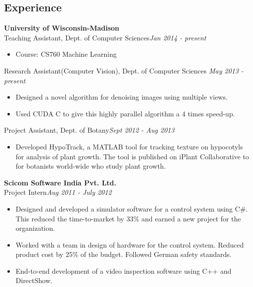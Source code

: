 \documentclass[margin]{res}
\begin{document}
\begin{resume}
\section{Experience}
 {\bf University of Wisconsin-Madison} \\
Teaching Assistant,  Dept. of Computer Sciences\hfill {\it Jan 2014 - present}
\begin{itemize} \itemsep -2pt  %
 \item Course: CS760 Machine Learning
\end{itemize}

Research Assistant(Computer Vision), Dept. of Computer Sciences \hfill {\it May 2013 - present}
 \begin{itemize} \itemsep -2pt  %
 \item Designed a novel algorithm for denoising images using multiple views.
 \item Used CUDA C to give this highly parallel algorithm a 4 times speed-up. 
 \end{itemize}


Project Assistant,  Dept. of Botany\hfill {\it Sept 2012 - Aug 2013}
 \begin{itemize} \itemsep -2pt  %
 \item Developed HypoTrack, a MATLAB tool for tracking texture on hypocotyls for analysis of plant growth. The tool is published on iPlant Collaborative to for botanists world-wide who study plant growth.
 \end{itemize}
  {\bf Scicom Software India Pvt. Ltd.} \\
Project Intern\hfill{\it Aug 2011 - July 2012}
 \begin{itemize} \itemsep -2pt  %
 \item Designed and developed a simulator software for a control system using C\#. This reduced the time-to-market by 33\% and earned a new project for the organization.
 \item Worked with a team in design of hardware for the control system. Reduced product cost by 25\% of the budget. Followed German safety standards. 
 \item End-to-end development of a video inspection software using C++ and DirectShow.
 \end{itemize}

\end{resume}
\end{document}
